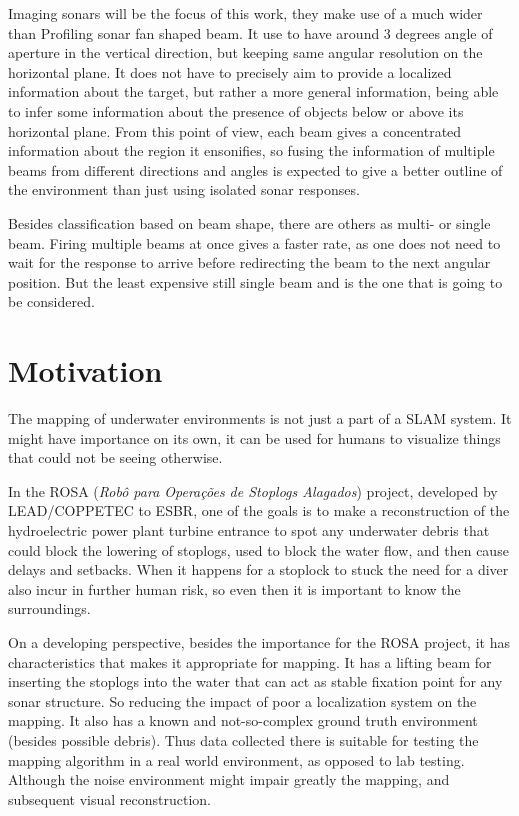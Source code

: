 \documentclass{article}
\begin{document}
Imaging sonars will be the focus of this work, they make use of a much wider
than Profiling sonar fan shaped beam. It use to have around $3$ degrees angle of
aperture in the vertical direction, but keeping same angular resolution on the
horizontal plane.
It does not have to precisely aim to provide a localized information about the
target, but rather a more general information, being able to infer some information
about the presence of objects below or above its horizontal plane. From this
point of view, each beam gives a concentrated information about the region it
ensonifies, so fusing the information of multiple beams from different
directions and angles is expected to give a better outline of the environment
than just using isolated sonar responses.

Besides classification based on beam shape, there are others as multi- or single
beam. Firing multiple beams at once gives a faster rate, as one does not need to
wait for the response to arrive before redirecting the beam to the next angular
position. But the least expensive still single beam and is the one that is going
to be considered.


\section{Motivation}

The mapping of underwater environments is not just a part of a SLAM system. It
might have importance on its own, it can be used for humans to visualize things
that could not be seeing otherwise. 

In the ROSA (\textit{Robô para Operações de Stoplogs Alagados}) project,
developed by LEAD/COPPETEC to ESBR, one of the goals is to make a reconstruction
of the hydroelectric power plant turbine entrance to spot any underwater debris
that could block the lowering of stoplogs, used to block the water flow, and
then cause delays and setbacks. When it happens for a stoplock to stuck the need
for a diver also incur in further human risk, so even then it is important to
know the surroundings.

On a developing perspective, besides the importance for the ROSA project, it has
characteristics that makes it appropriate for mapping. It has a lifting beam for
inserting the stoplogs into the water that can act as stable fixation point for
any sonar structure. So reducing the impact of poor a localization system on the
mapping. It also has a known and not-so-complex ground truth environment
(besides possible debris). Thus data collected there is suitable for testing the mapping
algorithm in a real world environment, as opposed to lab testing.
Although the noise environment might impair greatly the mapping, and subsequent
visual reconstruction.
\end{document}
